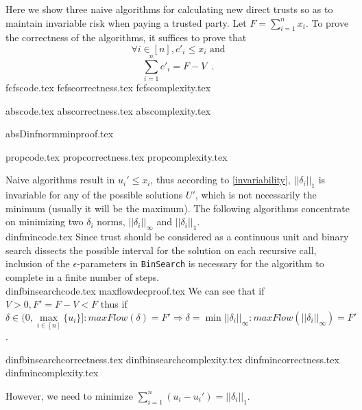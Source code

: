 \documentclass[11pt]{llncs}
\begin{document}
  Here we show three naive algorithms for calculating new direct trusts so as to maintain invariable risk when paying
  a trusted party. Let $F = \sum\limits_{i=1}^{n}x_i$. To prove the correctness of the algorithms, it suffices to prove that
  \begin{equation}
  \label{naive:req1}
     \forall i \in [n], c'_i \leq x_i \mbox{ and}
  \end{equation}
  \begin{equation}
  \label{naive:req2}
     \sum\limits_{i=1}^{n}c'_i = F - V \enspace.
  \end{equation}
  {fcfscode.tex}
  {fcfscorrectness.tex}
  {fcfscomplexity.tex}

  {abscode.tex}
  {abscorrectness.tex}
  {abscomplexity.tex}

  {absDinfnormminproof.tex}

  {propcode.tex}
  {propcorrectness.tex}
  {propcomplexity.tex}

  Naive algorithms result in $u_i' \leq x_i$, thus according to \ref{invariability}, $||\delta_i||_1$ is invariable for
  any of the possible solutions $U'$, which is not necessarily the minimum (usually it will be the maximum). The following
  algorithms concentrate on minimizing two $\delta_i$ norms, $||\delta_i||_\infty$ and $||\delta_i||_1$. \\
  {dinfmincode.tex}
  Since trust should be considered as a continuous unit and binary search dissects the possible interval for the solution
  on each recursive call, inclusion of the $\epsilon$-parameters in \texttt{BinSearch} is necessary for the algorithm to
  complete in a finite number of steps. \\
  {dinfbinsearchcode.tex}
  {maxflowdecproof.tex}
  We can see that if $V > 0, F' = F - V < F$ thus if $\delta \in (0, \max\limits_{i \in [n]}\{u_i\}]:
  maxFlow(\delta)= F' \Rightarrow \delta = \min||\delta_i||_\infty : maxFlow(||\delta_i||_\infty) = F'$.

  {dinfbinsearchcorrectness.tex}
  {dinfbinsearchcomplexity.tex}
  {dinfmincorrectness.tex}
  {dinfmincomplexity.tex}

  However, we need to minimize $\sum\limits_{i=1}^{n}(u_i-u_i') = ||\delta_i||_1$.
\end{document}
